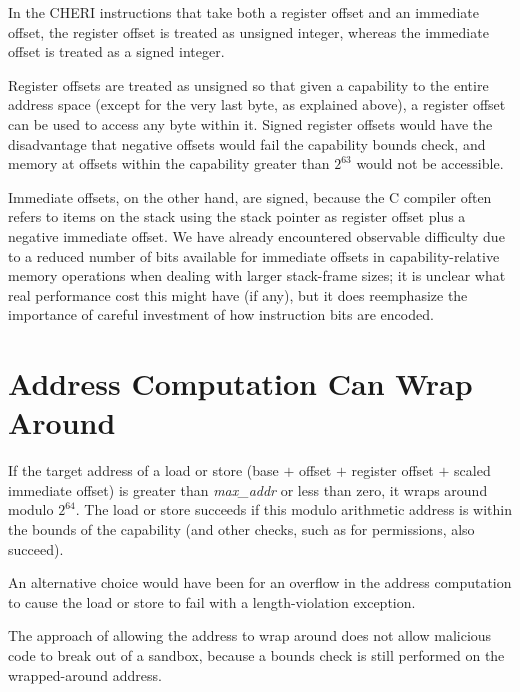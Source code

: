 In the CHERI instructions that take both a register offset and an immediate
offset, the register offset is treated as unsigned integer, whereas the
immediate offset is treated as a signed integer.

Register offsets are treated as unsigned so that given a capability to
the entire address space (except for the very last byte, as
explained above), a register offset can be used to access any byte within it.
Signed register offsets would have the disadvantage that negative offsets
would fail the capability bounds check, and memory at offsets within the
capability greater than $2^{63}$ would not be accessible.

Immediate offsets, on the other hand, are signed, because the C compiler
often refers to items on the stack using the stack pointer as register
offset plus a negative immediate offset.
We have already encountered observable difficulty due to a reduced number of
bits available for immediate offsets in capability-relative memory operations
when dealing with larger stack-frame sizes; it is unclear what real
performance cost this might have (if any), but it does reemphasize the
importance of careful investment of how instruction bits are encoded.

\section{Address Computation Can Wrap Around}

If the target address of a load or store (base $+$ offset $+$ register offset
$+$ scaled immediate offset) is greater than \emph{max\_addr} or less than
zero, it wraps around modulo $2^{64}$. The load or store succeeds if this
modulo arithmetic address is within the bounds of the capability (and other
checks, such as for permissions, also succeed).

An alternative choice would have been for an overflow in the address computation
to cause the load or store to fail with a length-violation exception.

The approach of allowing the address to wrap around does not allow malicious
code to break out of a sandbox, because a bounds check is still performed on
the wrapped-around address.

